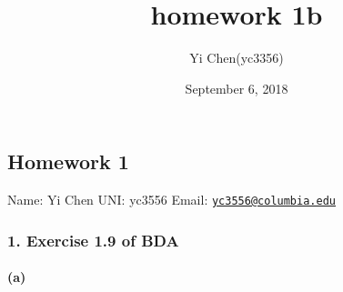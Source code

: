 \documentclass[]{article}
\title{homework 1b}
\author{Yi Chen(yc3356)}
\date{September 6, 2018}
\let\oldparagraph\paragraph
\renewcommand{\paragraph}[1]{\oldparagraph{#1}\mbox{}}
\begin{document}
\maketitle

\subsection{Homework 1}\label{homework-1}

Name: Yi Chen UNI: yc3556 Email:
\href{mailto:yc3556@columbia.edu}{\nolinkurl{yc3556@columbia.edu}}

\subsubsection{1. Exercise 1.9 of BDA}\label{exercise-1.9-of-bda}

\paragraph{(a)}\label{a}
\end{document}
